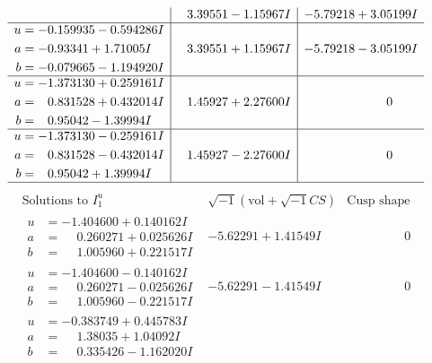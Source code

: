 \documentclass[1p]{elsarticle_modified}
\theoremstyle{definition}
\newcommand{\I}{\sqrt{-1}}
\begin{document}
$$\begin{array}{c|c|c}
 & \phantom{-}3.39551 - 1.15967 I & -5.79218 + 3.05199 I \\ \hline\begin{aligned}
u &= -0.159935 - 0.594286 I \\
a &= -0.93341 + 1.71005 I \\
b &= -0.079665 - 1.194920 I\end{aligned}
 & \phantom{-}3.39551 + 1.15967 I & -5.79218 - 3.05199 I \\ \hline\begin{aligned}
u &= -1.373130 + 0.259161 I \\
a &= \phantom{-}0.831528 + 0.432014 I \\
b &= \phantom{-}0.95042 - 1.39994 I\end{aligned}
 & \phantom{-}1.45927 + 2.27600 I & \phantom{-0.000000 } 0 \\ \hline\begin{aligned}
u &= -1.373130 - 0.259161 I \\
a &= \phantom{-}0.831528 - 0.432014 I \\
b &= \phantom{-}0.95042 + 1.39994 I\end{aligned}
 & \phantom{-}1.45927 - 2.27600 I & \phantom{-0.000000 } 0\\
 \hline 
 \end{array}$$\newpage$$\begin{array}{c|c|c}  
\text{Solutions to }I^u_{1}& \I (\text{vol} + \sqrt{-1}CS) & \text{Cusp shape}\\
 \hline 
\begin{aligned}
u &= -1.404600 + 0.140162 I \\
a &= \phantom{-}0.260271 + 0.025626 I \\
b &= \phantom{-}1.005960 + 0.221517 I\end{aligned}
 & -5.62291 + 1.41549 I & \phantom{-0.000000 } 0 \\ \hline\begin{aligned}
u &= -1.404600 - 0.140162 I \\
a &= \phantom{-}0.260271 - 0.025626 I \\
b &= \phantom{-}1.005960 - 0.221517 I\end{aligned}
 & -5.62291 - 1.41549 I & \phantom{-0.000000 } 0 \\ \hline\begin{aligned}
u &= -0.383749 + 0.445783 I \\
a &= \phantom{-}1.38035 + 1.04092 I \\
b &= \phantom{-}0.335426 - 1.162020 I\end{aligned}

\end{array}$$
\end{document}
